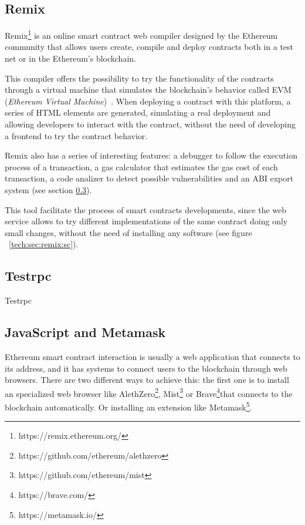 
\subsection{Remix}
Remix\footnote{https://remix.ethereum.org/} is an online smart
contract web compiler designed by the Ethereum community that allows users
create, compile and deploy contracts both in a test net or in the Ethereum's
blockchain.

This compiler offers the possibility to try the functionality of the contracts
through a virtual machine that simulates the blockchain's behavior called EVM
(\emph{Ethereum Virtual Machine})~\cite{hildenbrandt2017kevm}. When deploying a
contract with this platform, a series of HTML elements are generated, simulating
a real deployment and allowing developers to interact with the contract, without
the need of developing a frontend to try the contract behavior.

Remix also has a series of interesting features: a debugger to follow the
execution process of a transaction, a gas calculator that estimates the gas cost
of each transaction, a code analizer to detect possible vulnerabilities and an
ABI export system (see section \ref{jsmm}).

This tool facilitate the process of smart contracts developments, since the web
service allows to try different implementations of the same contract doing only
small changes, without the need of installing any software (see figure
~\ref{tech:sec:remix:sc}).

\subsection{Testrpc}
\label{testrpc}

Testrpc

\subsection{JavaScript and Metamask}
\label{jsmm}
Ethereum smart contract interaction is usually a web application that connects
to its address, and it has systems to connect users to the blockchain through
web browsers. There are two different ways to achieve this: the first one is to
install an specialized web browser like
AlethZero\footnote{https://github.com/ethereum/alethzero},
Mist\footnote{https://github.com/ethereum/mist} or
Brave\footnote{https://brave.com/}that connects to the blockchain automatically.
Or installing an extension like Metamask\footnote{https://metamask.io/}.


